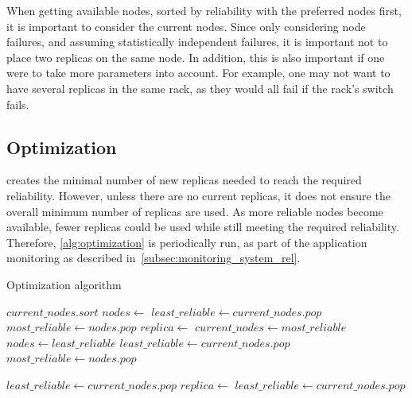 \documentclass{cslthse-msc}
\begin{document}
When getting available nodes, sorted by reliability with the preferred nodes first, it is important to consider the current nodes. Since only considering node failures, and assuming statistically independent failures, it is important not to place two replicas on the same node. In addition, this is also important if one were to take more parameters into account. For example, one may not want to have several replicas in the same rack, as they would all fail if the rack's switch fails.

\subsection{Optimization} \label{subsec:design_optimization}
 creates the minimal number of new replicas needed to reach the required reliability. However, unless there are no current replicas, it does not ensure the overall minimum number of replicas are used. As more reliable nodes become available, fewer replicas could be used while still meeting the required reliability. Therefore, \cref{alg:optimization} is periodically run, as part of the application monitoring as described in~\cref{subsec:monitoring_system_rel}.

\begin{algorithm} 
	\caption{Optimization algorithm} \label{alg:optimization}
	\begin{algorithmic}[1]
	\Statex
	\State $current\_nodes.sort$
	\State $nodes\gets $ 
	\State $least\_reliable\gets current\_nodes.pop$
	\State $most\_reliable\gets nodes.pop$
			\State $replica\gets $
			\State
			\State
			\State
			\State $current\_nodes\gets most\_reliable$
			\State $nodes\gets least\_reliable$
			\State $least\_reliable\gets current\_nodes.pop$
			\State $most\_reliable\gets nodes.pop$
	\EndWhile
	\EndProcedure
	\State
	
	\State $least\_reliable\gets current\_nodes.pop$
		\State $replica\gets $
		\State
		\State $least\_reliable\gets current\_nodes.pop$
	\EndWhile
	\EndProcedure
	\end{algorithmic}
\end{algorithm}
\end{document}
